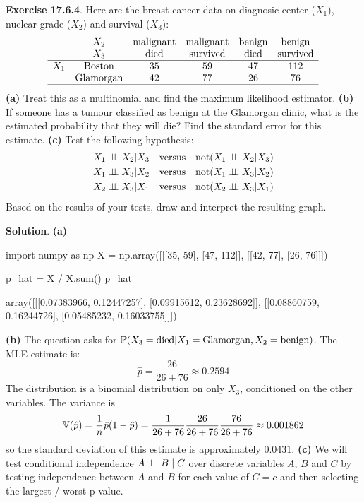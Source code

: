 \textbf{Exercise 17.6.4}. Here are the breast cancer data on diagnosic
center (\(X_{1}\)), nuclear grade (\(X_{2}\)) and survival (\(X_{3}\)):
\[
\begin{array}{cccccc}
    & X_{2} & \text{malignant} & \text{malignant} & \text{benign} & \text{benign}   \\
    & X_{3} & \text{died}      & \text{survived}  & \text{died}   & \text{survived} \\
\hline
X_{1} & \text{Boston}    & 35 & 59 & 47 & 112 \\
    & \text{Glamorgan} & 42 & 77 & 26 & 76 \\
\hline
\end{array}
\]
\textbf{(a)} Treat this as a multinomial and find the maximum likelihood
estimator.
\textbf{(b)} If someone has a tumour classified as benign at the
Glamorgan clinic, what is the estimated probability that they will die?
Find the standard error for this estimate.
\textbf{(c)} Test the following hypothesis:
\begin{align*}
X_{1} \ci X_{2} |  X_{3} \quad &\text{versus} \quad \text{not} (X_{1} \ci X_{2} |  X_{3} ) \\
X_{1} \ci X_{3} |  X_{2} \quad &\text{versus} \quad \text{not} (X_{1} \ci X_{3} |  X_{2} ) \\
X_{2} \ci X_{3} |  X_{1} \quad &\text{versus} \quad \text{not} (X_{2} \ci X_{3} |  X_{1} ) \\
\end{align*}
Based on the results of your tests, draw and interpret the resulting
graph.

\textbf{Solution}.
\textbf{(a)}

\begin{python}
import numpy as np
X = np.array([[[35, 59], [47, 112]], [[42, 77], [26, 76]]])
\end{python}

\begin{python}
p_hat = X / X.sum()
p_hat
\end{python}
\begin{console}
array([[[0.07383966, 0.12447257],
        [0.09915612, 0.23628692]],
       [[0.08860759, 0.16244726],
        [0.05485232, 0.16033755]]])
\end{console}
\textbf{(b)} The question asks for
\(\operatorname{\mathbb{P}}( X_{3} = \text{died} | X_{1} = \text{Glamorgan}, X_{2} = \text{benign})\).
The MLE estimate is:
\[
\hat{p} = \frac{26}{26 + 76} \approx 0.2594
\]
The distribution is a binomial distribution on only \(X_{3}\), conditioned
on the other variables.
The variance is
\[
\operatorname{\mathbb{V}}(\hat{p}) = \frac{1}{n}\hat{p} (1 - \hat{p}) = \frac{1}{26 + 76} \frac{26}{26 + 76} \frac{76}{26 + 76}  \approx 0.001862
\]
so the standard deviation of this estimate is approximately \(0.0431\).
\textbf{(c)}
We will test conditional independence \(A \perp\!\!\!\perp B \;|\; C\) over
discrete variables \(A\), \(B\) and \(C\) by testing independence
between \(A\) and \(B\) for each value of \(C = c\) and then selecting
the largest / worst p-value.

